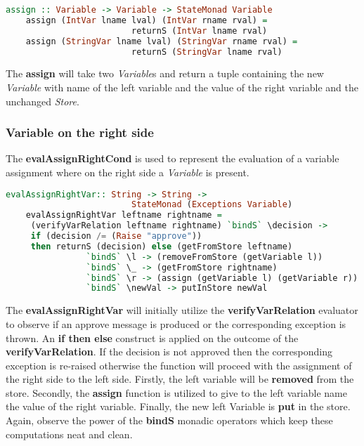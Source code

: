 \documentclass[a4paper, onecolumn]{article}
\begin{document}
    \begin{tcolorbox}
    \begin{lstlisting}[language=Haskell] 
    assign :: Variable -> Variable -> StateMonad Variable 
    assign (IntVar lname lval) (IntVar rname rval) = 
                         returnS (IntVar lname rval)
    assign (StringVar lname lval) (StringVar rname rval) =
                         returnS (StringVar lname rval)
    \end{lstlisting}
    \end{tcolorbox}
    
    \noindent The \textbf{assign} will take two \textit{Variable}s and return a tuple containing the new \textit{Variable} with name of the left variable and the value of the right variable and the unchanged \textit{Store}.  
    
    
    \subsubsection{Variable on the right side}
    
    The \textbf{evalAssignRightCond} is used to represent the evaluation of a variable assignment where on the right side a \textit{Variable} is present.
    
    \begin{tcolorbox}
    \begin{lstlisting}[language=Haskell] 
    evalAssignRightVar:: String -> String ->
                         StateMonad (Exceptions Variable)
    evalAssignRightVar leftname rightname = 
     (verifyVarRelation leftname rightname) `bindS` \decision -> 
     if (decision /= (Raise "approve")) 
     then returnS (decision) else (getFromStore leftname) 
                `bindS` \l -> (removeFromStore (getVariable l)) 
                `bindS` \_ -> (getFromStore rightname) 
                `bindS` \r -> (assign (getVariable l) (getVariable r)) 
                `bindS` \newVal -> putInStore newVal
    \end{lstlisting}
    \end{tcolorbox}
    
    \noindent The \textbf{evalAssignRightVar} will initially utilize the \textbf{verifyVarRelation} evaluator to observe if an approve message is produced or the corresponding exception is thrown. An \textbf{if then else} construct is applied on the outcome of the \textbf{verifyVarRelation}. If the decision is not approved then the corresponding exception is re-raised otherwise the function will proceed with the assignment of the right side to the left side. Firstly, the left variable will be \textbf{removed} from the store. Secondly, the \textbf{assign} function is utilized to give to the left variable name the value of the right variable. Finally, the new left Variable is \textbf{put} in the store. Again, observe the power of the \textbf{bindS} monadic operators which keep these computations neat and clean.   
    
\end{document}
